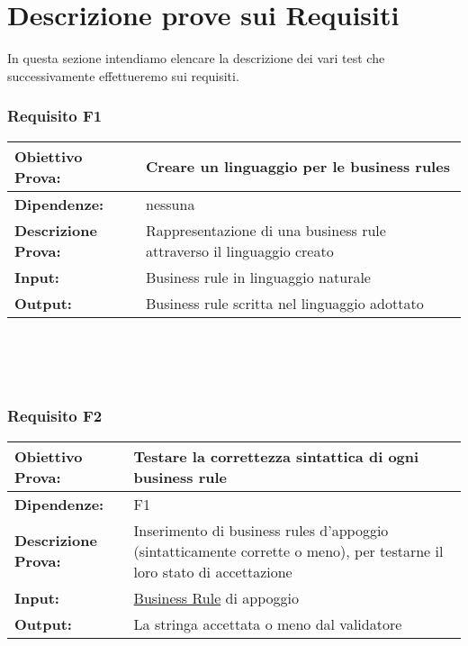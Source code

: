 \section{Descrizione prove sui Requisiti}
In questa sezione intendiamo elencare la descrizione dei vari test che successivamente effettueremo sui requisiti.

\subsubsection{Requisito F1}
\begin{tabular}{||p{4cm}||p{8cm}||}
\hline
{\textbf {Obiettivo Prova:}}& Creare un linguaggio per le business rules \\ \hline
{\textbf{Dipendenze:}}& nessuna \\ \hline
{\textbf{Descrizione Prova:}}& Rappresentazione di una business rule attraverso il linguaggio creato \\ \hline
{\textbf{Input:}}&  Business rule in linguaggio naturale \\ \hline
{\textbf{Output:}}& Business rule scritta nel linguaggio adottato \\ \hline
\end{tabular} \\
\\
\\
\subsubsection{Requisito F2}
\begin{tabular}{||p{4cm}||p{8cm}||}
\hline
{\textbf {Obiettivo Prova:}}& Testare la correttezza sintattica di ogni business rule \\ \hline
{\textbf{Dipendenze:}}& F1 \\ \hline
{\textbf{Descrizione Prova:}}& Inserimento di business rules d'appoggio (sintatticamente corrette o meno), per testarne il loro stato di accettazione \\ \hline
{\textbf{Input:}}& \underline{Business Rule} di appoggio \\ \hline
{\textbf{Output:}}& La stringa accettata o meno dal validatore \\ \hline
\end{tabular} \\
\\
\\
